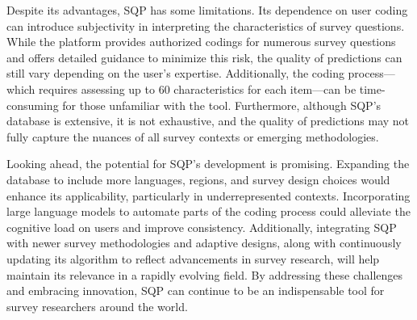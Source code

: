 \documentclass[
  letterpaper,
  DIV=11,
  numbers=noendperiod]{scrartcl}
\begin{document}
Despite its advantages, SQP has some limitations. Its dependence on user
coding can introduce subjectivity in interpreting the characteristics of
survey questions. While the platform provides authorized codings for
numerous survey questions and offers detailed guidance to minimize this
risk, the quality of predictions can still vary depending on the user's
expertise. Additionally, the coding process---which requires assessing
up to 60 characteristics for each item---can be time-consuming for those
unfamiliar with the tool. Furthermore, although SQP's database is
extensive, it is not exhaustive, and the quality of predictions may not
fully capture the nuances of all survey contexts or emerging
methodologies.

Looking ahead, the potential for SQP's development is promising.
Expanding the database to include more languages, regions, and survey
design choices would enhance its applicability, particularly in
underrepresented contexts. Incorporating large language models to
automate parts of the coding process could alleviate the cognitive load
on users and improve consistency. Additionally, integrating SQP with
newer survey methodologies and adaptive designs, along with continuously
updating its algorithm to reflect advancements in survey research, will
help maintain its relevance in a rapidly evolving field. By addressing
these challenges and embracing innovation, SQP can continue to be an
indispensable tool for survey researchers around the world.
\end{document}
